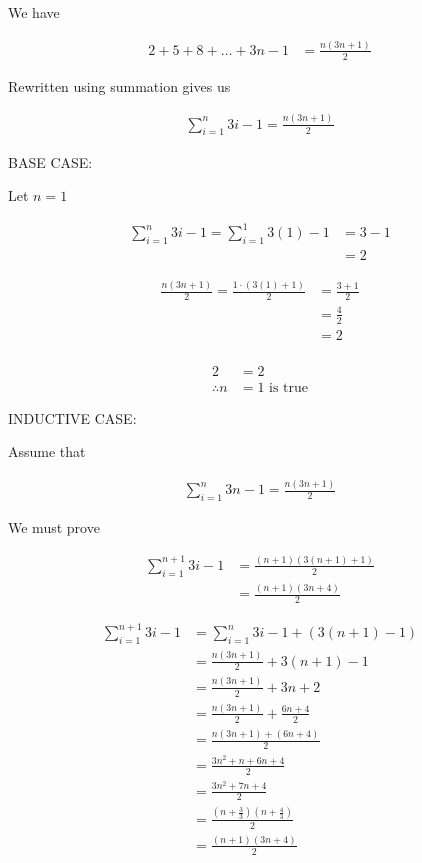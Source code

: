 \documentclass[../Main.tex]{subfiles}
\begin{document}
We have

\begin{align*}
    2 + 5 + 8 + \ldots + 3n - 1 &= \frac{n(3n + 1)}{2}
\end{align*}

Rewritten using summation gives us

\begin{align*}
    \sum_{i = 1}^{n}{3i - 1} = \frac{n(3n + 1)}{2}
\end{align*}

\begin{poof}
    BASE CASE:

    Let $n = 1$

    \begin{align*}
        \sum_{i = 1}^{n}{3i - 1} = \sum_{i = 1}^{1}{3(1) - 1} &= 3 - 1 \\
        &= \boxed{2}
    \end{align*}

    \begin{align*}
        \frac{n(3n + 1)}{2} = \frac{1 \cdot (3(1) + 1)}{2} &= \frac{3 + 1}{2} \\
        &= \frac{4}{2} \\
        &= \boxed{2} \\
    \end{align*}

    \begin{align*}
        2 &= 2 \\
        \therefore n &= 1 \text{ is true}
    \end{align*}

    INDUCTIVE CASE:

    Assume that

    \begin{align*}
        \sum_{i = 1}^{n}{3n - 1} = \frac{n(3n + 1)}{2}
    \end{align*}

    We must prove

    \begin{align*}
        \sum_{i = 1}^{n + 1}{3i - 1} &= \frac{(n + 1)(3(n + 1) + 1)}{2} \\
        &= \frac{(n + 1)(3n + 4)}{2}
    \end{align*}

    \begin{align*}
        \sum_{i = 1}^{n + 1}{3i - 1} &= \sum_{i = 1}^{n}{3i - 1} + \left(3(n + 1) - 1\right) \\
        &= \frac{n(3n + 1)}{2} + 3(n + 1) - 1 \\
        &= \frac{n(3n + 1)}{2} + 3n + 2 \\
        &= \frac{n(3n + 1)}{2} + \frac{6n + 4}{2} \\
        &= \frac{n(3n + 1) + (6n + 4)}{2} \\
        &= \frac{3n^2 + n + 6n + 4}{2} \\
        &= \frac{3n^2 + 7n + 4}{2} \\
        &= \frac{(n + \frac{3}{3})(n + \frac{4}{3})}{2} \\
        &= \boxed{\frac{(n + 1)(3n + 4)}{2}}
    \end{align*}


\end{poof}
\end{document}
